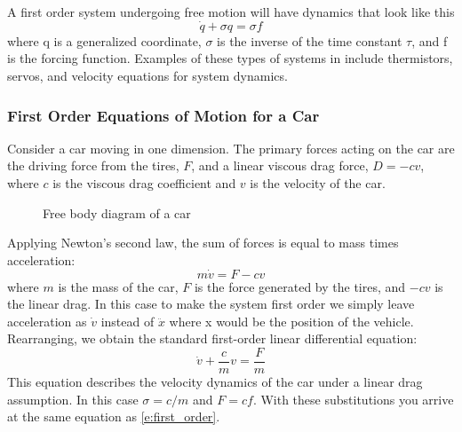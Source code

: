A first order system undergoing free motion will have dynamics that look like this
\begin{equation} \label{e:first_order}
\dot{q} + \sigma q = \sigma f
\end{equation}
\noindent where q is a generalized coordinate, $\sigma$ is the inverse of the time constant $\tau$, and f is the forcing function. Examples of these types of systems in include thermistors, servos, and velocity equations for system dynamics. 

\subsubsection{First Order Equations of Motion for a Car}

Consider a car moving in one dimension. The primary forces acting on the car are the driving force from the tires, $F$, and a linear viscous drag force, $D = -cv$, where $c$ is the viscous drag coefficient and $v$ is the velocity of the car.
\begin{figure}[H]
    \centering
    \caption{Free body diagram of a car}
    \label{f:car_fbd}
\end{figure}
\noindent Applying Newton's second law, the sum of forces is equal to mass times acceleration:
\begin{equation}
  m\dot{v} = F - cv
\end{equation}
where $m$ is the mass of the car, $F$ is the force generated by the tires, and $-cv$ is the linear drag. In this case to make the system first order we simply leave acceleration as $\dot{v}$ instead of $\ddot{x}$ where x would be the position of the vehicle. Rearranging, we obtain the standard first-order linear differential equation:
\begin{equation}
  \dot{v} + \frac{c}{m}v = \frac{F}{m}
\end{equation}
This equation describes the velocity dynamics of the car under a linear drag assumption. In this case $\sigma = c/m$ and $F = cf$. With these substitutions you arrive at the same equation as \ref{e:first_order}.

